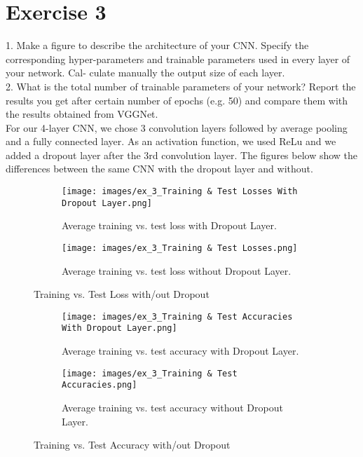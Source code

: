 \section*{Exercise 3}





1. Make a figure to describe the architecture of your CNN. Specify the corresponding
hyper-parameters and trainable parameters used in every layer of your network. Cal-
culate manually the output size of each layer. \\
2. What is the total number of trainable parameters of your network? Report the results
you get after certain number of epochs (e.g. 50) and compare them with the results
obtained from VGGNet.\\

For our 4-layer CNN, we chose 3 convolution layers followed by average pooling and a fully connected layer. As an activation function, we used ReLu and we added a dropout layer after the 3rd convolution layer. The figures below show the differences between the same CNN with the dropout layer and without.

\begin{figure}[H]
    \centering
    \begin{subfigure}[t]{0.48\textwidth}
        \centering
        \texttt{[image: images/ex\_3\_Training \& Test Losses With Dropout Layer.png]}
        \caption{Average training vs. test loss with Dropout Layer.}
    \end{subfigure}
    \hfill
    \begin{subfigure}[t]{0.48\textwidth}
        \centering
        \texttt{[image: images/ex\_3\_Training \& Test Losses.png]}
        \caption{Average training vs. test loss without Dropout Layer.}
    \end{subfigure}
    \caption{Training vs. Test Loss with/out Dropout}
\end{figure}

\begin{figure}[H]
    \centering
    \begin{subfigure}[t]{0.48\textwidth}
        \centering
        \texttt{[image: images/ex\_3\_Training \& Test Accuracies With Dropout Layer.png]}
        \caption{Average training vs. test accuracy with Dropout Layer.}
    \end{subfigure}
    \hfill
    \begin{subfigure}[t]{0.48\textwidth}
        \centering
        \texttt{[image: images/ex\_3\_Training \& Test Accuracies.png]}
        \caption{Average training vs. test accuracy without Dropout Layer.}
    \end{subfigure}
    \caption{Training vs. Test Accuracy with/out Dropout}
\end{figure}

